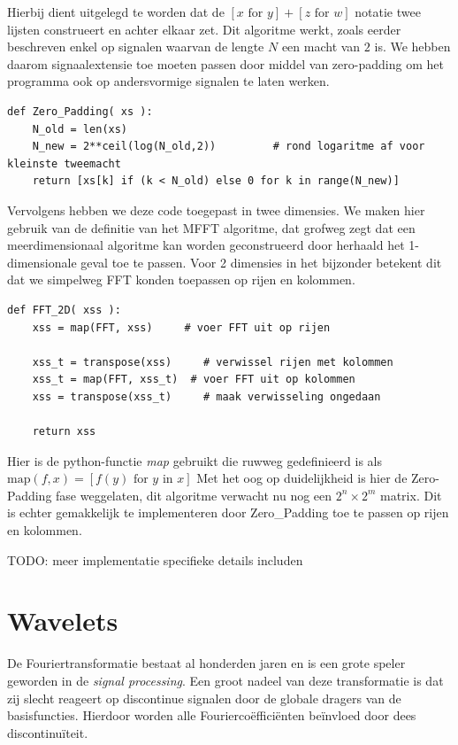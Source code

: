 \documentclass[11pt]{report}
\theoremstyle{plain}
\theoremstyle{remark}
\begin{document}
Hierbij dient uitgelegd te worden dat de $[x \text{ for } y] + [z \text{ for } w]$ notatie twee lijsten construeert en achter elkaar zet. Dit algoritme werkt, zoals eerder beschreven enkel op signalen waarvan de lengte
$N$ een macht van $2$ is. We hebben daarom signaalextensie toe moeten passen door middel van zero-padding
om het programma ook op andersvormige signalen te laten werken.

\begin{lstlisting}[caption={Zero-Padding algoritme in Python, voegt nullen toe tot een tweemacht is bereikt}]
def Zero_Padding( xs ):
    N_old = len(xs)
    N_new = 2**ceil(log(N_old,2))         # rond logaritme af voor kleinste tweemacht
    return [xs[k] if (k < N_old) else 0 for k in range(N_new)]
\end{lstlisting}

Vervolgens hebben we deze code toegepast in twee dimensies. We maken hier gebruik van de definitie van het
MFFT algoritme, dat grofweg zegt dat een meerdimensionaal algoritme kan worden geconstrueerd door herhaald 
het 1-dimensionale geval toe te passen. Voor 2 dimensies in het bijzonder betekent dit dat we simpelweg 
FFT konden toepassen op rijen en kolommen.

\begin{lstlisting}[caption=2-Dimensionaal FFT algoritme]
def FFT_2D( xss ):
    xss = map(FFT, xss)     # voer FFT uit op rijen

    xss_t = transpose(xss)     # verwissel rijen met kolommen
    xss_t = map(FFT, xss_t)  # voer FFT uit op kolommen
    xss = transpose(xss_t)     # maak verwisseling ongedaan 

    return xss
\end{lstlisting}
Hier is de python-functie \emph{map} gebruikt die ruwweg gedefinieerd is als 
$\text{map}(f,x) = [f(y) \text{ for } y \text{ in } x]$
Met het oog op duidelijkheid is hier de Zero-Padding fase weggelaten, 
dit algoritme verwacht nu nog een $2^n \times 2^m$ matrix.
Dit is echter gemakkelijk te implementeren door Zero\_Padding toe te passen op rijen en kolommen.

TODO: meer implementatie specifieke details includen

\fi
\chapter{Wavelets}
De Fouriertransformatie bestaat al honderden jaren en is een grote speler geworden in de \emph{signal processing}. Een groot nadeel van deze transformatie is dat zij slecht reageert op discontinue signalen door de globale dragers van de basisfuncties. Hierdoor worden alle Fourierco\"effici\"enten be\"invloed door dees discontinu\"iteit.
\end{document}
